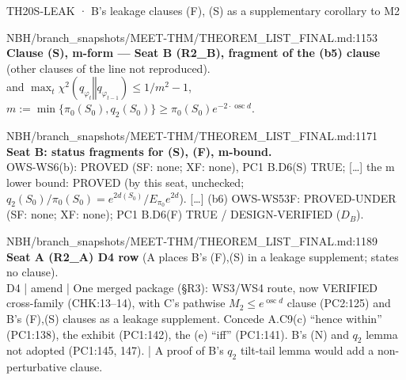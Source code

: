 \begin{card}{TH20}{S-LEAK · B's leakage clauses (F), (S) as a supplementary corollary to M2}
\begin{stmt}{NBH/branch_snapshots/MEET-THM/THEOREM_LIST_FINAL.md:1153}
\textbf{Clause (S), m-form — Seat B (R2\_B), fragment of the (b5) clause} (other clauses of the line not reproduced).\\
and $\max_t χ^2(q_{φ_t}‖q_{φ_{t−1}}) ≤ 1/m^2 − 1$, $m := \min\{π_0(S_0), q_2(S_0)\} ≥ π_0(S_0)e^{−2\cdot\operatorname{osc} d}$.
\end{stmt}

\begin{stmt}{NBH/branch_snapshots/MEET-THM/THEOREM_LIST_FINAL.md:1171}
\textbf{Seat B: status fragments for (S), (F), m-bound.}\\
OWS-WS6(b): PROVED (SF: none; XF: none), PC1 B.D6(S) TRUE; […] the m lower bound: PROVED (by this seat, unchecked; $q_2(S_0)/π_0(S_0) = e^{2d(S_0)}/E_{π_0}e^{2d}$). […] (b6) OWS-WS53F: PROVED-UNDER (SF: none; XF: none); PC1 B.D6(F) TRUE / DESIGN-VERIFIED ($D_B$).
\end{stmt}

\begin{stmt}{NBH/branch_snapshots/MEET-THM/THEOREM_LIST_FINAL.md:1189}
\textbf{Seat A (R2\_A) D4 row} (A places B's (F),(S) in a leakage supplement; states no clause).\\
D4 | amend | One merged package (§R3): WS3/WS4 route, now VERIFIED cross-family (CHK:13–14), with C's pathwise $M_2 ≤ e^{\operatorname{osc} d}$ clause (PC2:125) and B's (F),(S) clauses as a leakage supplement. Concede A.C9(c) ``hence within'' (PC1:138), the exhibit (PC1:142), the (e) ``iff'' (PC1:141). B's (N) and $q_2$ lemma not adopted (PC1:145, 147). | A proof of B's $q_2$ tilt-tail lemma would add a non-perturbative clause.
\end{stmt}


\end{card}
